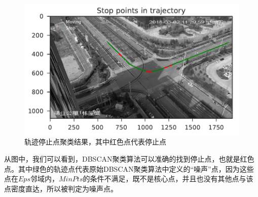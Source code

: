 \documentclass[UTF8, 12pt]{ctexart}
\begin{document}
\begin{figure}[H]
	\centering
	\includegraphics[width=0.8\linewidth]{..//Plots//stopTrk.pdf}
	\caption{轨迹停止点聚类结果，其中红色点代表停止点}
	\label{Fig:3}
	\vspace{-0.5em}
\end{figure}

从图中，我们可以看到，DBSCAN聚类算法可以准确的找到停止点，也就是红色点。其中绿色的轨迹点代表原始DBSCAN聚类算法中定义的“噪声”点，因为这些点在$Eps$邻域内，$MinPts$的条件不满足，既不是核心点，并且也没有其他点与该点密度直达，所以被判定为噪声点。
\end{document}
